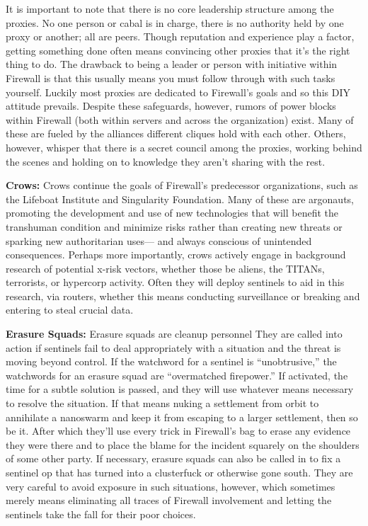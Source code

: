 It is important to note that there is no core leadership
structure among the proxies. No one person or
cabal is in charge, there is no authority held by one 
proxy or another; all are peers. Though reputation 
and experience play a factor, getting something done 
often means convincing other proxies that it's the 
right thing to do. The drawback to being a leader 
or person with initiative within Firewall is that this 
usually means you must follow through with such 
tasks yourself. Luckily most proxies are dedicated 
to Firewall's goals and so this DIY attitude prevails. 
Despite these safeguards, however, rumors of power 
blocks within Firewall (both within servers and 
across the organization) exist. Many of these are 
fueled by the alliances different cliques hold with 
each other. Others, however, whisper that there is 
a secret council among the proxies, working behind 
the scenes and holding on to knowledge they aren't 
sharing with the rest.

\textbf{Crows:} Crows continue the goals of Firewall's 
predecessor organizations, such as the Lifeboat Institute
and Singularity Foundation. Many of these
are argonauts, promoting the development and use 
of new technologies that will benefit the transhuman 
condition and minimize risks rather than creating 
new threats or sparking new authoritarian uses—
and always conscious of unintended consequences. 
Perhaps more importantly, crows actively engage 
in background research of potential x-risk vectors, 
whether those be aliens, the TITANs, terrorists, or 
hypercorp activity. Often they will deploy sentinels 
to aid in this research, via routers, whether this 
means conducting surveillance or breaking and entering
to steal crucial data.

\textbf{Erasure Squads:} Erasure squads are cleanup personnel
They are called into action if sentinels fail to
deal appropriately with a situation and the threat is 
moving beyond control. If the watchword for a sentinel
is ``unobtrusive,'' the watchwords for an erasure
squad are ``overmatched firepower.'' If activated, the 
time for a subtle solution is passed, and they will use 
whatever means necessary to resolve the situation. 
If that means nuking a settlement from orbit to annihilate
a nanoswarm and keep it from escaping to
a larger settlement, then so be it. After which they'll 
use every trick in Firewall's bag to erase any evidence 
they were there and to place the blame for the incident
squarely on the shoulders of some other party.
If necessary, erasure squads can also be called in to 
fix a sentinel op that has turned into a clusterfuck or 
otherwise gone south. They are very careful to avoid 
exposure in such situations, however, which sometimes
merely means eliminating all traces of Firewall
involvement and letting the sentinels take the fall for 
their poor choices.

